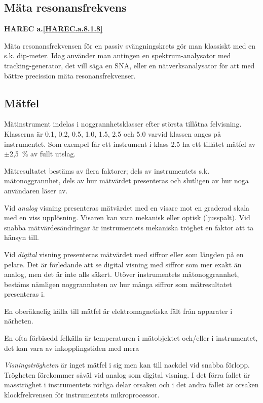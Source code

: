 \subsection{Mäta resonansfrekvens}
\textbf{
HAREC a.\ref{HAREC.a.8.1.8}\label{myHAREC.a.8.1.8}
}

Mäta resonansfrekvensen för en passiv svängningskrets gör man klassiskt
med en s.k. dip-meter.
Idag använder man antingen en spektrum-analysator med tracking-generator,
det vill säga en SNA, eller en nätverksanalysator för att med bättre precission mäta
resonansfrekvenser.

\subsection{Mätfel}

Mätinstrument indelas i noggrannhetsklasser efter största tillåtna felvisning.
Klasserna är 0.1, 0.2, 0.5, 1.0, 1.5, 2.5 och 5.0 varvid klassen anges på
instrumentet.
Som exempel får ett instrument i klass 2.5 ha ett tillåtet mätfel av
\(\pm\)2,5~\% av fullt utslag.

Mätresultatet bestäms av flera faktorer; dels av instrumentets
s.k. mätonoggrannhet, dels av hur mätvärdet presenteras och slutligen
av hur noga användaren läser av.

Vid \emph{analog} visning presenteras mätvärdet med en visare mot en
graderad skala med en viss upplösning.
Visaren kan vara mekanisk eller optisk (ljusspalt).
Vid snabba mätvärdesändringar är instrumentets mekaniska tröghet en faktor
att ta hänsyn till.

Vid \emph{digital} visning presenteras mätvärdet med siffror eller som
längden på en pelare.
Det är förledande att se digital visning med siffror som mer exakt än analog,
men det är inte alls säkert.
Utöver instrumentets mätonoggrannhet, bestäms nämligen noggrannheten av hur
många siffror som mätresultatet presenteras i.

En oberäknelig källa till mätfel är elektromagnetiska fält från
apparater i närheten.

En ofta förbisedd felkälla är temperaturen i mätobjektet och/eller i
instrumentet, det kan vara av inkopplingstiden med mera

\emph{Visningströgheten} är inget mätfel i sig men kan till nackdel
vid snabba förlopp.
Trögheten förekommer såväl vid analog som digital visning.
I det förra fallet är masströghet i instrumentets rörliga delar orsaken och i
det andra fallet är orsaken klockfrekvensen för instrumentets mikroprocessor.
